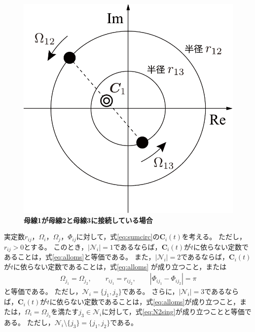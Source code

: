 \documentclass[tombow,dvipdfmx]{corona-a5-1.1}
\begin{document}
\begin{figure}[t]
\centering
\includegraphics[width = .4\linewidth]{figs/centerg}
\medskip
\caption{\textbf{母線1が母線2と母線3に接続している場合}}
\label{fig:centerg}
\medskip
\end{figure}


\begin{補題}[電力バランス方程式から導かれる母線の同期]
\label{lem:sumc2}
実定数$r_{ij}$，$\Omega_i$，$\Omega_j$，$\Phi_{ij}$に対して，式\ref{eq:sumcirc}の$\bm{C}_i (t)$を考える。
ただし，$r_{ij}>0$とする。
このとき，$|\mathcal{N}_i|=1$であるならば，$\bm{C}_i (t)$が$t$に依らない定数であることは，式\ref{eq:alloms}と等価である。
また，$|\mathcal{N}_i|=2$であるならば，$\bm{C}_i (t)$が$t$に依らない定数であることは，式\ref{eq:alloms}
が成り立つこと，または
\begin{align}\label{eq:N2sing}
\Omega_{j_1} = \Omega_{j_2}
,\qquad
r_{i j_1} = r_{i j_2}
,\qquad
|\Phi_{i j_1}-\Phi_{i j_2}| = \pi
\end{align}
と等価である。
ただし，$\mathcal{N}_i = \{j_1,j_2\}$である。
さらに，$|\mathcal{N}_i|=3$であるならば，$\bm{C}_i (t)$が$t$に依らない定数であることは，式\ref{eq:alloms}が成り立つこと，または，$\Omega_{i} = \Omega_{j_3}$を満たす$j_3 \in \mathcal{N}_i$に対して，式\ref{eq:N2sing}が成り立つことと等価である。
ただし，$ \mathcal{N}_i \setminus \{j_3\}=\{j_1,j_2\}$である。
\end{補題}
\end{document}
